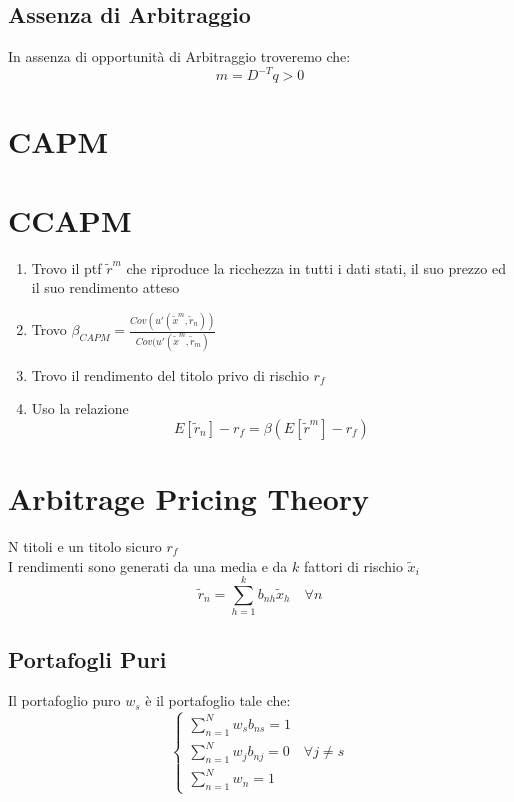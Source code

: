 \documentclass[a4paper,notitlepage]{report}%
\begin{document}
\begin{multicols*}{2}
    \subsection*{Assenza di Arbitraggio}
    In assenza di opportunità di Arbitraggio troveremo che:
    \[
        m  = D^{-T}q > 0     
    \]

\section*{CAPM}



\section*{CCAPM}
    \begin{enumerate}
        \item Trovo il ptf $\tilde{r}^m$ che riproduce la ricchezza in tutti i dati stati, il suo prezzo ed il suo rendimento atteso
        \item Trovo $\beta_{CAPM} = \frac{Cov(u'(\tilde{x}^m,\tilde{r}_n))}{Cov(u'(\tilde{x}^m,\tilde{r}_m)}$
        \item Trovo il rendimento del titolo privo di rischio $r_f$
        \item Uso la relazione \[
                E[\tilde{r}_n]-r_f = \beta (E[\tilde{r}^m]-r_f) 
            \]
    \end{enumerate}


\section*{Arbitrage Pricing Theory}
    N titoli e un titolo sicuro $r_f$\\
    I rendimenti sono generati da una media e da $k$ fattori
    di rischio $\tilde{x}_i$
    \[
        \tilde{r}_n = \sum_{h=1}^k b_{nh} \tilde{x}_h \quad \forall n  
    \]

    \subsection*{Portafogli Puri}
    Il portafoglio puro $w_s$ è il portafoglio tale che:
    \[
        \left\{\begin{array}{l}
            \sum_{n=1}^N w_s b_{ns} = 1 \\
            \sum_{n=1}^N w_j b_{nj} = 0 \quad \forall j\neq s \\
            \sum_{n=1}^N w_n  = 1
        \end{array}\right.  
    \]


\end{multicols*}
\end{document}
